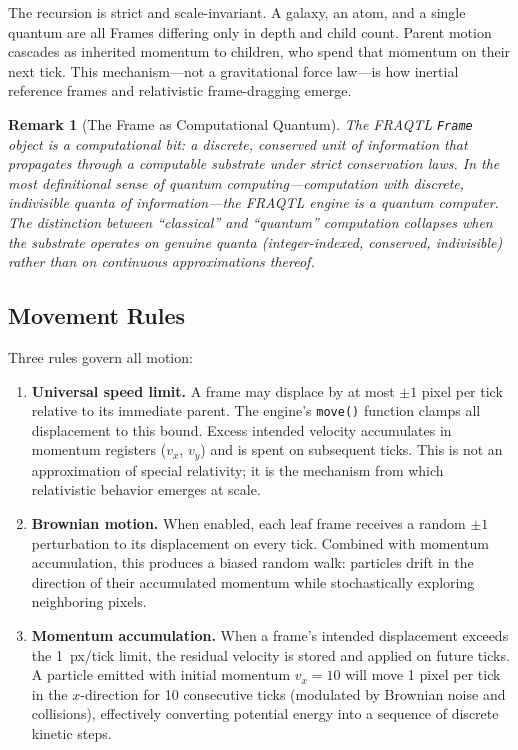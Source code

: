 \documentclass[11pt,a4paper]{article}
\newtheorem{remark}[theorem]{Remark}
\begin{document}
The recursion is strict and scale-invariant. A galaxy, an atom, and a single quantum are all Frames differing only in depth and child count. Parent motion cascades as inherited momentum to children, who spend that momentum on their next tick. This mechanism---not a gravitational force law---is how inertial reference frames and relativistic frame-dragging emerge.

\begin{remark}[The Frame as Computational Quantum]
The FRAQTL \texttt{Frame} object is a \emph{computational bit}: a discrete, conserved unit of information that propagates through a computable substrate under strict conservation laws. In the most definitional sense of quantum computing---computation with discrete, indivisible quanta of information---the FRAQTL engine \emph{is} a quantum computer. The distinction between ``classical'' and ``quantum'' computation collapses when the substrate operates on genuine quanta (integer-indexed, conserved, indivisible) rather than on continuous approximations thereof.
\end{remark}

\subsection{Movement Rules}

Three rules govern all motion:

\begin{enumerate}
    \item \textbf{Universal speed limit.} A frame may displace by at most $\pm 1$ pixel per tick relative to its immediate parent. The engine's \texttt{move()} function clamps all displacement to this bound. Excess intended velocity accumulates in momentum registers ($v_x$, $v_y$) and is spent on subsequent ticks. This is not an approximation of special relativity; it is the mechanism from which relativistic behavior emerges at scale.

    \item \textbf{Brownian motion.} When enabled, each leaf frame receives a random $\pm 1$ perturbation to its displacement on every tick. Combined with momentum accumulation, this produces a biased random walk: particles drift in the direction of their accumulated momentum while stochastically exploring neighboring pixels.

    \item \textbf{Momentum accumulation.} When a frame's intended displacement exceeds the 1~px/tick limit, the residual velocity is stored and applied on future ticks. A particle emitted with initial momentum $v_x = 10$ will move 1 pixel per tick in the $x$-direction for 10 consecutive ticks (modulated by Brownian noise and collisions), effectively converting potential energy into a sequence of discrete kinetic steps.
\end{enumerate}
\end{document}
